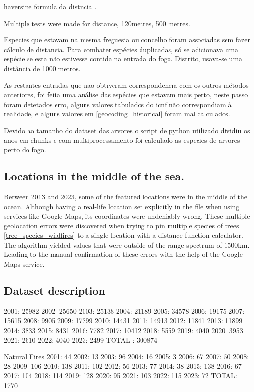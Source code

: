 haversine formula da distncia \cite{esri2024}.


Multiple tests were made for distance, 120metres, 500 metres.

Especies que estavam na mesma freguesia ou concelho foram associadas sem fazer cálculo de distancia. Para combater espécies duplicadas, só se adicionava uma espécie se esta não estivesse contida na entrada do fogo.
Distrito, usava-se uma distância de 1000 metros.

As restantes entradas que não obtiveram correspondencia com os outros métodos anteriores, foi feita uma análise das espécies que estavam mais perto, neste passo foram detetados erro, alguns valores tabulados do icnf não correspondiam à realidade, e alguns valores em \ref{geocoding_historical} foram mal calculados.

Devido ao tamanho do dataset das arvores o script de python utilizado dividiu os anos em chunks e com multiprocessamento foi calculado as especies de arvores perto do fogo.


\subsection{Locations in the middle of the sea.}
Between 2013 and 2023, some of the featured locations were in the middle of the ocean. Although having a real-life location set explicitly in the file when using services like Google Maps, its coordinates were undeniably wrong. These multiple geolocation errors were discovered when trying to pin multiple species of trees \ref{tree_species_wildfires} to a single location with a distance function calculator. The algorithm yielded values that were outside of the range spectrum of 1500km. Leading to the manual confirmation of these errors with the help of the Google Maps service.


\subsection{Dataset description}
2001: 25982
2002: 25650
2003: 25138
2004: 21189
2005: 34578
2006: 19175
2007: 15615
2008: 9905
2009: 17399
2010: 14431
2011: 14913
2012: 11841
2013: 11899
2014: 3833
2015: 8431
2016: 7782
2017: 10412
2018: 5559
2019: 4040
2020: 3953
2021: 2610
2022: 4040
2023: 2499
TOTAL : 300874

Natural Fires
2001: 44
2002: 13
2003: 96
2004: 16
2005: 3
2006: 67
2007: 50
2008: 28
2009: 106
2010: 138
2011: 102
2012: 56
2013: 77
2014: 38
2015: 138
2016: 67
2017: 104
2018: 114
2019: 128
2020: 95
2021: 103
2022: 115
2023: 72
TOTAL: 1770

